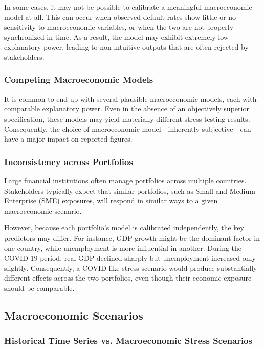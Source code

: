 \documentclass[11pt,a4paper]{article}
\begin{document}
In some cases, it may not be possible to calibrate a meaningful macroeconomic model at all. This can occur when observed default rates show little or no sensitivity to macroeconomic variables, or when the two are not properly synchronized in time. As a result, the model may exhibit extremely low explanatory power, leading to non-intuitive outputs that are often rejected by stakeholders.

\subsubsection{Competing Macroeconomic Models}

It is common to end up with several plausible macroeconomic models, each with comparable explanatory power. Even in the absence of an objectively superior specification, these models may yield materially different stress-testing results. Consequently, the choice of macroeconomic model - inherently subjective - can have a major impact on reported figures.

\subsubsection{Inconsistency across Portfolios}

Large financial institutions often manage portfolios across multiple countries. Stakeholders typically expect that similar portfolios, such as Small-and-Medium-Enterprise (SME) exposures, will respond in similar ways to a given macroeconomic scenario.

However, because each portfolio's model is calibrated independently, the key predictors may differ. For instance, GDP growth might be the dominant factor in one country, while unemployment is more influential in another. During the COVID-19 period, real GDP declined sharply but unemployment increased only slightly. Consequently, a COVID-like stress scenario would produce substantially different effects across the two portfolios, even though their economic exposure should be comparable.

\subsection{Macroeconomic Scenarios}

\subsubsection{Historical Time Series vs. Macroeconomic Stress Scenarios}
\end{document}
